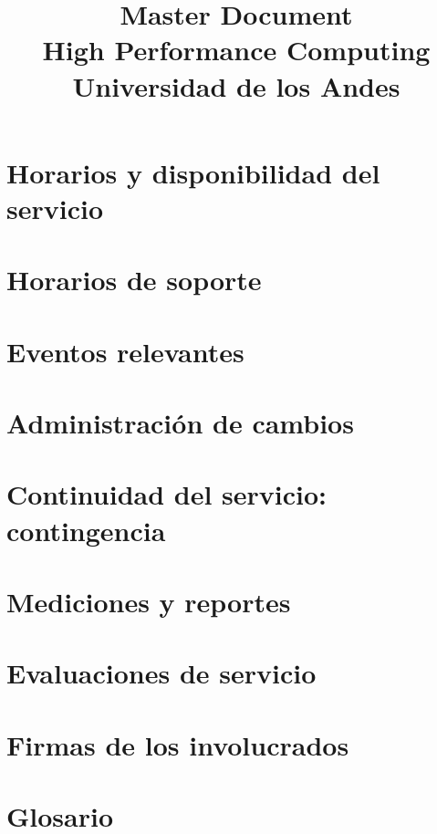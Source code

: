 \documentclass{article}
\title{Master Document\\
High Performance Computing\\
Universidad de los Andes}
\begin{document}
\maketitle





\section{Horarios y disponibilidad del servicio}
\section{Horarios de soporte}
\section{Eventos relevantes}
\section{Administraci\'on de cambios}
\section{Continuidad del servicio: contingencia}
\section{Mediciones y reportes}
\section{Evaluaciones de servicio}
\section{Firmas de los involucrados}
\section{Glosario}
\end{document}
